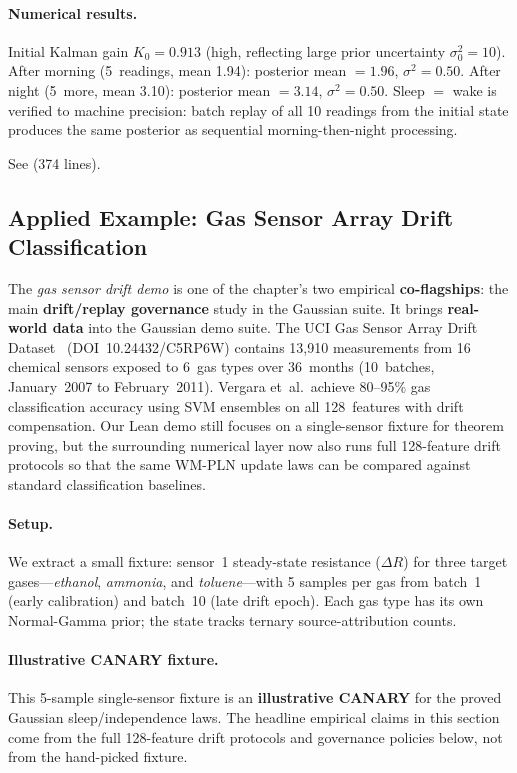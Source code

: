 \documentclass[11pt,openany]{report}
\begin{document}
\paragraph{Numerical results.}
Initial Kalman gain $K_0 = 0.913$ (high, reflecting large prior
uncertainty $\sigma^2_0 = 10$).  After morning (5~readings, mean 1.94):
posterior mean $= 1.96$, $\sigma^2 = 0.50$.  After night
(5~more, mean 3.10): posterior mean $= 3.14$, $\sigma^2 = 0.50$.
Sleep $=$ wake is verified to machine precision: batch replay of all
10 readings from the initial state produces the same posterior as
sequential morning-then-night processing.

See  (374 lines).

\subsection{Applied Example: Gas Sensor Array Drift Classification}

The \emph{gas sensor drift demo} is one of the chapter's two empirical
\textbf{co-flagships}: the main \textbf{drift/replay governance} study
in the Gaussian suite.  It brings \textbf{real-world data} into the
Gaussian demo suite.  The UCI Gas Sensor Array Drift
Dataset~\cite{Vergara2012GasSensorDrift} (DOI~10.24432/C5RP6W)
contains 13,910 measurements from 16 chemical sensors exposed to
6~gas types over 36~months (10~batches, January~2007 to
February~2011).  Vergara et~al.\ achieve 80--95\% gas classification
accuracy using SVM ensembles on all 128~features with drift
compensation.  Our Lean demo still focuses on a single-sensor fixture
for theorem proving, but the surrounding numerical layer now also runs
full 128-feature drift protocols so that the same WM-PLN update laws can
be compared against standard classification baselines.

\paragraph{Setup.}
We extract a small fixture: sensor~1 steady-state resistance ($\Delta R$)
for three target gases---\emph{ethanol}, \emph{ammonia}, and
\emph{toluene}---with 5 samples per gas from batch~1 (early calibration)
and batch~10 (late drift epoch).  Each gas type has its own
Normal-Gamma prior; the state tracks ternary source-attribution counts.

\paragraph{Illustrative CANARY fixture.}
This 5-sample single-sensor fixture is an \textbf{illustrative CANARY}
for the proved Gaussian sleep/independence laws.  The headline empirical
claims in this section come from the full 128-feature drift protocols
and governance policies below, not from the hand-picked fixture.
\end{document}
